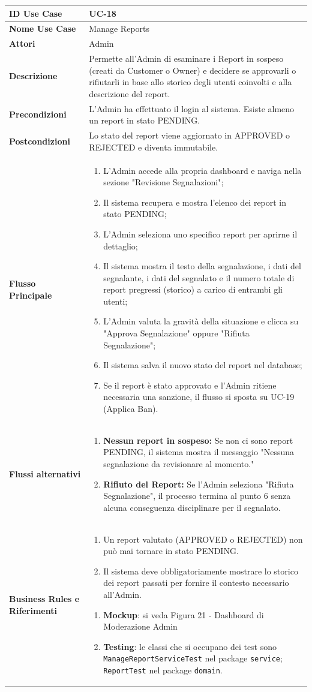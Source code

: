 \documentclass{article}
\newcommand{\usecasetable}[9]{
	\begin{table}[h!]
		\centering
		\footnotesize
		\renewcommand{\arraystretch}{1.4}
		\begin{tabularx}{\textwidth}{|l|>{\raggedright\arraybackslash}X|}
			\hline
			\textbf{ID Use Case} & #1 \\ \hline
			\textbf{Nome Use Case} & #2 \\ \hline
			\textbf{Attori} & #3 \\ \hline
			\textbf{Descrizione} & #4 \\ \hline
			\textbf{Precondizioni} & #5 \\ \hline
			\textbf{Postcondizioni} & #6 \\ \hline
			\textbf{Flusso Principale} & #7 \\ \hline
			\textbf{Flussi alternativi} & #8 \\ \hline
			\textbf{Business Rules e Riferimenti} & #9 \\ \hline
		\end{tabularx}
	\end{table}
}
\begin{document}
	\newpage
	
	\usecasetable
	{UC-18}
	{Manage Reports}
	{Admin}
	{Permette all'Admin di esaminare i Report in sospeso (creati da Customer o Owner) e decidere se approvarli o rifiutarli in base allo storico degli utenti coinvolti e alla descrizione del report.}
	{L'Admin ha effettuato il login al sistema. Esiste almeno un report in stato PENDING.}
	{Lo stato del report viene aggiornato in APPROVED o REJECTED e diventa immutabile.}
	{
		\begin{enumerate}[nosep, leftmargin=*]
			\item L'Admin accede alla propria dashboard e naviga nella sezione "Revisione Segnalazioni";
			\item Il sistema recupera e mostra l'elenco dei report in stato PENDING;
			\item L'Admin seleziona uno specifico report per aprirne il dettaglio;
			\item Il sistema mostra il testo della segnalazione, i dati del segnalante, i dati del segnalato e il numero totale di report pregressi (storico) a carico di entrambi gli utenti;
			\item L'Admin valuta la gravità della situazione e clicca su "Approva Segnalazione" oppure "Rifiuta Segnalazione";
			\item Il sistema salva il nuovo stato del report nel database;
			\item Se il report è stato approvato e l'Admin ritiene necessaria una sanzione, il flusso si sposta su UC-19 (Applica Ban).
		\end{enumerate}
	}
	{
		\begin{enumerate}[nosep, leftmargin=25px]
			\item[\textbf{2a.}] \textbf{Nessun report in sospeso:} Se non ci sono report PENDING, il sistema mostra il messaggio "Nessuna segnalazione da revisionare al momento."
			\item[\textbf{5a.}] \textbf{Rifiuto del Report:} Se l'Admin seleziona "Rifiuta Segnalazione", il processo termina al punto 6 senza alcuna conseguenza disciplinare per il segnalato.
		\end{enumerate}
	}
	{
		\begin{enumerate}[nosep, leftmargin=*]
			\item[•] Un report valutato (APPROVED o REJECTED) non può mai tornare in stato PENDING.
			\item[•] Il sistema deve obbligatoriamente mostrare lo storico dei report passati per fornire il contesto necessario all'Admin.
		\end{enumerate}
		
		\begin{enumerate}[leftmargin=*]
			\item[•] \textbf{Mockup}: si veda Figura 21 - Dashboard di Moderazione Admin 
			
			\item[•] \textbf{Testing}: le classi che si occupano dei test sono \texttt{ManageReportServiceTest} nel package \texttt{service}; \texttt{ReportTest} nel package \texttt{domain}.
		\end{enumerate}
	}
		
\end{document}
